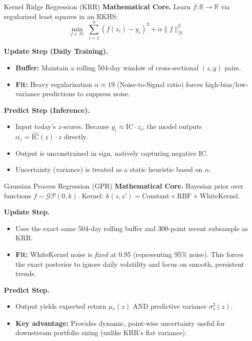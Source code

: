 \documentclass[aspectratio=169, 11pt]{beamer}
\newcommand{\IC}{\mathrm{IC}}
\newcommand{\GP}{\mathcal{GP}}
\newcommand{\Hk}{\mathcal{H}}
\newcommand{\R}{\mathbb{R}}
\begin{document}
\begin{frame}{Kernel Ridge Regression (KRR)}
  \textbf{Mathematical Core.} Learn $f\colon\R\to\R$ via regularized least squares in an RKHS:
  \[
    \min_{f\in\Hk}\;\sum_{i=1}^n(f(z_i)-y_i)^2 + \alpha\|f\|_\Hk^2
  \]

  \textbf{Update Step (Daily Training).}
  \begin{itemize}
    \item \textbf{Buffer:} Maintain a rolling 504-day window of cross-sectional $(z, y)$ pairs.
    \item \textbf{Fit:} Heavy regularization $\alpha \approx 19$ (Noise-to-Signal ratio) forces high-bias/low-variance predictions to suppress noise.
  \end{itemize}

  \textbf{Predict Step (Inference).}
  \begin{itemize}
    \item Input today's $z$-scores. Because $y_i \approx \IC \cdot z_i$, the model outputs $\alpha_z = \widehat{\IC}(z) \cdot z$ directly.
    \item Output is unconstrained in sign, natively capturing negative IC.
    \item Uncertainty (variance) is treated as a static heuristic based on $\alpha$.
  \end{itemize}
\end{frame}

\begin{frame}{Gaussian Process Regression (GPR)}
  \textbf{Mathematical Core.} Bayesian prior over functions $f\sim\GP(0,k)$.
  Kernel: $k(z,z') = \text{Constant} \times \text{RBF} + \text{WhiteKernel}$.

  \textbf{Update Step.}
  \begin{itemize}
    \item Uses the exact same 504-day rolling buffer and 300-point recent subsample as KRR.
    \item \textbf{Fit:} WhiteKernel noise is \emph{fixed} at 0.95 (representing 95\% noise). This forces the exact posterior to ignore daily volatility and focus on smooth, persistent trends.
  \end{itemize}

  \textbf{Predict Step.}
  \begin{itemize}
    \item Output yields expected return $\mu_*(z)$ AND predictive variance $\sigma_*^2(z)$.
    \item \textbf{Key advantage:} Provides dynamic, point-wise uncertainty useful for downstream portfolio sizing (unlike KRR's flat variance).
  \end{itemize}

\end{frame}
\end{document}
